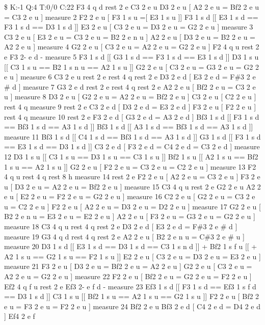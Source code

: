 \$ K\+:-\/1 Q\+:4 T\+:0/0 C\+:22 F3 4 q d rest 2 e C3 2 e u D3 2 e u \mbox{[} A2 2 e u = Bf2 2 e u = C3 2 e u \mbox{]} measure 2 F2 2 e u \mbox{[} F3 1 s u =\mbox{[} E3 1 s u \mbox{]}\mbox{]} F3 1 s d \mbox{[}\mbox{[} E3 1 s d == F3 1 s d == D3 1 s d \mbox{]}\mbox{]} E3 2 e u \mbox{[} C3 2 e u = D3 2 e u = G2 2 e u \mbox{]} measure 3 C3 2 e u \mbox{[} E3 2 e u = C3 2 e u = B2 2 e n u \mbox{]} A2 2 e u \mbox{[} D3 2 e u = B2 2 e u = A2 2 e u \mbox{]} measure 4 G2 2 e u \mbox{[} C3 2 e u = A2 2 e u = G2 2 e u \mbox{]} F2 4 q u rest 2 e F3 2-\/ e d -\/ measure 5 F3 1 s d \mbox{[}\mbox{[} G3 1 s d == F3 1 s d == E3 1 s d \mbox{]}\mbox{]} D3 1 s u \mbox{[}\mbox{[} C3 1 s u == B2 1 s n u == A2 1 s u \mbox{]}\mbox{]} G2 2 e u \mbox{[} C3 2 e u = G3 2 e u = G2 2 e u \mbox{]} measure 6 C3 2 e u rest 2 e rest 4 q rest 2 e D3 2 e d \mbox{[} E3 2 e d = F\#3 2 e \# d \mbox{]} measure 7 G3 2 e d rest 2 e rest 4 q rest 2 e A2 2 e u \mbox{[} Bf2 2 e u = C3 2 e u \mbox{]} measure 8 D3 2 e u \mbox{[} G2 2 e u = A2 2 e u = Bf2 2 e u \mbox{]} C3 2 e u \mbox{[} C2 2 e u \mbox{]} rest 4 q measure 9 rest 2 e C3 2 e d \mbox{[} D3 2 e d = E3 2 e d \mbox{]} F3 2 e u \mbox{[} F2 2 e u \mbox{]} rest 4 q measure 10 rest 2 e F3 2 e d \mbox{[} G3 2 e d = A3 2 e d \mbox{]} Bf3 1 s d \mbox{[}\mbox{[} F3 1 s d == Bf3 1 s d == A3 1 s d \mbox{]}\mbox{]} Bf3 1 s d \mbox{[}\mbox{[} A3 1 s d == Bf3 1 s d == A3 1 s d \mbox{]}\mbox{]} measure 11 Bf3 1 s d \mbox{[}\mbox{[} C4 1 s d == Bf3 1 s d == A3 1 s d \mbox{]}\mbox{]} G3 1 s d \mbox{[}\mbox{[} F3 1 s d == E3 1 s d == D3 1 s d \mbox{]}\mbox{]} C3 2 e d \mbox{[} F3 2 e d = C4 2 e d = C3 2 e d \mbox{]} measure 12 D3 1 s u \mbox{[}\mbox{[} C3 1 s u == D3 1 s u == C3 1 s u \mbox{]}\mbox{]} Bf2 1 s u \mbox{[}\mbox{[} A2 1 s u == Bf2 1 s u == A2 1 s u \mbox{]}\mbox{]} G2 2 e u \mbox{[} F2 2 e u = C3 2 e u = C2 2 e u \mbox{]} measure 13 F2 4 q u rest 4 q rest 8 h measure 14 rest 2 e F2 2 e u \mbox{[} A2 2 e u = C3 2 e u \mbox{]} F3 2 e u \mbox{[} D3 2 e u = A2 2 e u = Bf2 2 e u \mbox{]} measure 15 C3 4 q u rest 2 e G2 2 e u A2 2 e u \mbox{[} E2 2 e u = F2 2 e u = G2 2 e u \mbox{]} measure 16 C2 2 e u \mbox{[} G2 2 e u = C3 2 e u = C2 2 e u \mbox{]} F2 2 e u \mbox{[} A2 2 e u = D3 2 e u = D2 2 e u \mbox{]} measure 17 G2 2 e u \mbox{[} B2 2 e n u = E3 2 e u = E2 2 e u \mbox{]} A2 2 e u \mbox{[} F3 2 e u = G3 2 e u = G2 2 e u \mbox{]} measure 18 C3 4 q u rest 4 q rest 2 e D3 2 e d \mbox{[} E3 2 e d = F\#3 2 e \# d \mbox{]} measure 19 G3 4 q d rest 4 q rest 2 e A2 2 e u \mbox{[} B2 2 e n u = C\#3 2 e \# u \mbox{]} measure 20 D3 1 s d \mbox{[}\mbox{[} E3 1 s d == D3 1 s d == C3 1 s n d \mbox{]}\mbox{]} + Bf2 1 s f u \mbox{[}\mbox{[} + A2 1 s u == G2 1 s u == F2 1 s u \mbox{]}\mbox{]} E2 2 e u \mbox{[} C3 2 e u = D3 2 e u = E3 2 e u \mbox{]} measure 21 F3 2 e u \mbox{[} D3 2 e u = Bf2 2 e u = A2 2 e u \mbox{]} G2 2 e u \mbox{[} C3 2 e u = A2 2 e u = G2 2 e u \mbox{]} measure 22 F2 2 e u \mbox{[} Bf2 2 e u = G2 2 e u = F2 2 e u \mbox{]} Ef2 4 q f u rest 2 e Ef3 2-\/ e f d -\/ measure 23 Ef3 1 s d \mbox{[}\mbox{[} F3 1 s d == Ef3 1 s f d == D3 1 s d \mbox{]}\mbox{]} C3 1 s u \mbox{[}\mbox{[} Bf2 1 s u == A2 1 s u == G2 1 s u \mbox{]}\mbox{]} F2 2 e u \mbox{[} Bf2 2 e u = F3 2 e u = F2 2 e u \mbox{]} measure 24 Bf2 2 e u Bf3 2 e d \mbox{[} C4 2 e d = D4 2 e d \mbox{]} Ef4 2 e f 